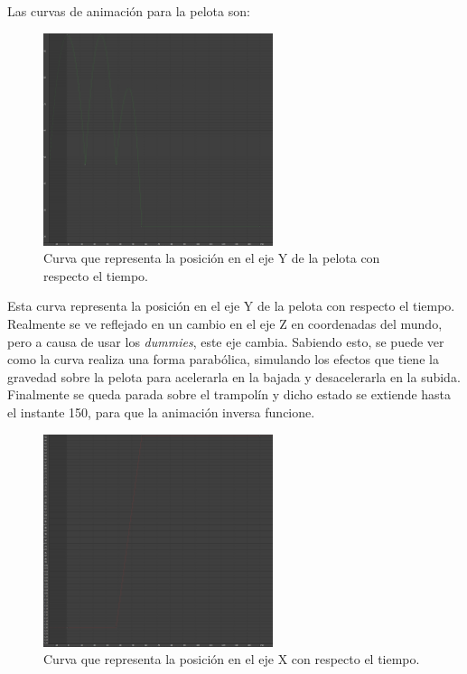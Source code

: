 \documentclass{article}
\begin{document}
Las curvas de animación para la pelota son:

\begin{figure}[H]
   \centering
   \includegraphics[width=0.6\textwidth]{imagenes/curvas/PL/pelota/green.png}
   \caption{Curva que representa la posición en el eje Y de la pelota con respecto el tiempo.}
\end{figure}

Esta curva representa la posición en el eje Y de la pelota con respecto el tiempo. Realmente se ve reflejado en un cambio en el eje Z en coordenadas del mundo, pero a causa de usar los \textit{dummies}, este eje cambia. Sabiendo esto, se puede ver como la curva realiza una forma parabólica, simulando los efectos que tiene la gravedad sobre la pelota para acelerarla en la bajada y desacelerarla en la subida. Finalmente se queda parada sobre el trampolín y dicho estado se extiende hasta el instante 150, para que la animación inversa funcione.

\begin{figure}[H]
   \centering
   \includegraphics[width=0.6\textwidth]{imagenes/curvas/PL/pelota/red.png}
   \caption{Curva que representa la posición en el eje X con respecto el tiempo.}
\end{figure}
\end{document}
